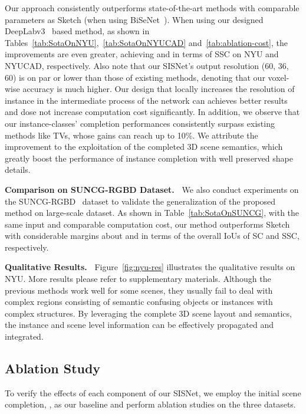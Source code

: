 \documentclass[final]{cvpr}
\begin{document}
Our approach consistently outperforms state-of-the-art methods with comparable parameters as Sketch \cite{Chen_2020_SketchAwareSSC} (when using BiSeNet~\cite{yu2018bisenet}). 
When using our designed DeepLabv3~\cite{chen2017deeplab} based method, 
as shown in Tables~\ref{tab:SotaOnNYU},~\ref{tab:SotaOnNYUCAD} and~\ref{tab:ablation-cost}, the improvements are even greater, achieving  and  in terms of SSC on NYU and NYUCAD, respectively. Also note that our SISNet's output resolution (60, 36, 60) is on par or lower than those of existing methods, denoting that our voxel-wise accuracy is much higher.
Our design that locally increases the resolution of instance in the intermediate process of the network can achieves better results and dose not increase computation cost significantly.
In addition, we observe that our instance-classes' completion performances consistently surpass existing methods like TVs, whose gains can reach up to 10\%. We attribute the improvement to the exploitation of the completed 3D scene semantics, which greatly boost the performance of instance completion with well preserved shape details.



\noindent \textbf{Comparison on SUNCG-RGBD Dataset.~}
We also conduct experiments on the SUNCG-RGBD~\cite{liu2018see-satnet} dataset to validate the generalization of the proposed method on large-scale dataset. As shown in Table~\ref{tab:SotaOnSUNCG}, with the same input and comparable computation cost, our method outperforms Sketch with  considerable margins about  and  in terms of the overall IoUs of SC and SSC, respectively.

\noindent \textbf{Qualitative Results.~}
Figure~\ref{fig:nyu-res} illustrates the qualitative results on NYU. More results please refer to supplementary materials. Although the previous methods work well for some scenes, they usually fail to deal with complex regions consisting of semantic confusing objects or instances with complex structures. By leveraging the complete 3D scene layout and semantics, the instance and scene level information can be effectively propagated and integrated.



\vspace{-0.2cm}
\subsection{Ablation Study}
\vspace{-0.1cm}
To verify the effects of each component of our SISNet, we employ the initial scene completion,  , as our baseline and perform ablation studies on the three datasets.
\end{document}

